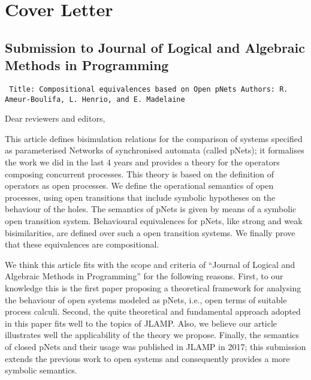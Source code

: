 \documentclass[10pt]{article}
\newenvironment{ttbox}{\begin{alltt}\small\tt}%
                      {\end{alltt}}
\begin{document}
\section*{Cover Letter }
\subsection*{Submission to Journal of Logical and Algebraic Methods in Programming}
\medskip
\begin{ttbox}
Title: Compositional equivalences based on Open pNets
Authors: R. Ameur-Boulifa, L. Henrio, and E. Madelaine
\end{ttbox}
\bigskip
Dear reviewers and editors,

\medskip
This article defines bisimulation relations  for the comparison of systems specified as parameterised Networks of synchronised automata (called pNets); it formalises the work we did in the last 4 years and provides a theory for the operators composing concurrent processes. This theory is based on the definition of operators as open processes. We define the operational semantics of open processes, using open transitions that include symbolic hypotheses on the behaviour of the holes. The  semantics of pNets is given by means of a symbolic open transition system. Behavioural equivalences for pNets, like strong and weak bisimilarities, are defined over such a open transition systems. We finally prove that these equivalences are compositional.



\smallskip

We think this article fits with the scope and criteria of ``Journal of Logical and Algebraic Methods in Programming'' for the following reasons. First, to our knowledge this is the first paper proposing a theoretical framework for analysing the behaviour of open systems modeled as pNets, i.e., open terms of suitable process calculi.
Second, the quite theoretical and fundamental approach adopted in this paper fits well to the topics of JLAMP.
Also, we believe our article illustrates well the applicability of the theory we propose.
Finally, the semantics of closed pNets and their usage was published in JLAMP in 2017; this submission extends the previous work to open systems and consequently provides a more symbolic semantics.
\end{document}
